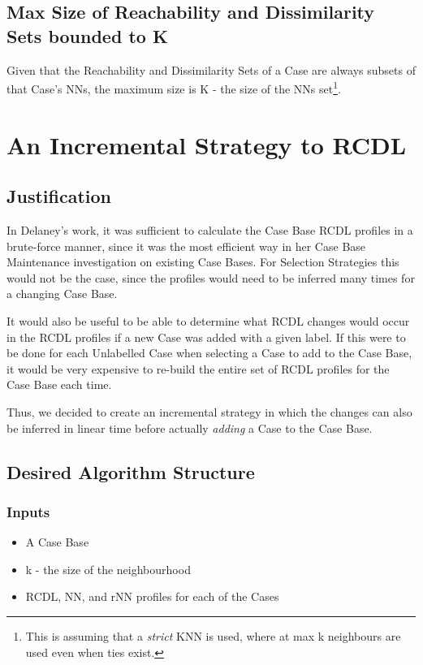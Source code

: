 \documentclass[a4paper,11pt]{report}
\begin{document}
\subsection{Max Size of Reachability and Dissimilarity Sets bounded to K}
Given that the Reachability and Dissimilarity Sets of a Case are always subsets of that Case's NNs, the maximum size is K - the size of the NNs set\footnote{This is assuming that a \emph{strict} KNN is used, where at max k neighbours are used even when ties exist.}.

\section{An Incremental Strategy to RCDL}
\subsection{Justification} 
In Delaney's work, it was sufficient to calculate the Case Base RCDL profiles in a brute-force manner, since it was the most efficient way in her Case Base Maintenance investigation on existing Case Bases. For Selection Strategies this would not be the case, since the profiles would need to be inferred many times for a changing Case Base.

It would also be useful to be able to determine what RCDL changes would occur in the RCDL profiles if a new Case was added with a given label. If this were to be done for each Unlabelled Case when selecting a Case to add to the Case Base, it would be very expensive to re-build the entire set of RCDL profiles for the Case Base each time.

Thus, we decided to create an incremental strategy in which the changes can also be inferred in linear time before actually \emph{adding} a Case to the Case Base.

\subsection{Desired Algorithm Structure}
\subsubsection{Inputs}
\begin{itemize}
	\item A Case Base 
	\item k - the size of the neighbourhood
	\item RCDL, NN, and rNN profiles for each of the Cases
\end{itemize}
\end{document}

